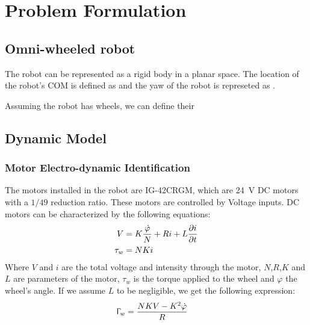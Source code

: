 %
\chapter{Problem Formulation} \label{chap::problem}


\section{Omni-wheeled robot} \label{sect::system}
The robot can be represented as a rigid body in a planar space. The location of the robot's \ac{COM} is defined as  and the yaw of the robot is represeted as .

Assuming the robot has  wheels, we can define their 


\section{Dynamic Model}

\newpage
\subsection{Motor Electro-dynamic Identification}


The motors installed in the robot are IG-42CRGM, which are \SI{24}{\volt} DC motors with a $1/49$ reduction ratio. These motors are controlled by Voltage inputs. DC motors can be characterized by the following equations:
\begin{align}
	V&=K\frac{\dot\varphi}{N} +Ri+L\frac{\partial i}{\partial t}\\
	\tau_{w}&=NKi
\end{align}
Where $V$ and $i$ are the total voltage and intensity through the motor, $N$,$R$,$K$ and $L$ are parameters of the motor, $\tau_w$ is the torque applied to the wheel and $\varphi$ the wheel's angle. If we assume $L$ to be negligible, we get the following expression:
\begin{align}
	\Upgamma_w&=\frac{NKV-K^2\dot\varphi}{R}
\end{align}


